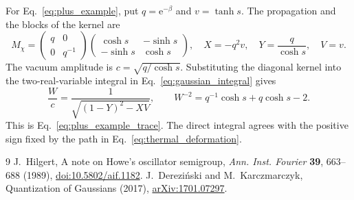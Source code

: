 \documentclass[11pt,a4paper]{article}
\newcommand{\ee}{\mathrm e}
\numberwithin{equation}{section}
\begin{document}
For Eq.~\eqref{eq:plus_example}, put $q=\ee^{-\beta}$ and $v=\tanh s$.
The propagation and the blocks of the kernel are
\begin{equation}
 M_\chi=
 \begin{pmatrix}q&0\\0&q^{-1}\end{pmatrix}
 \begin{pmatrix}\cosh s&-\sinh s\\-\sinh s&\cosh s\end{pmatrix},
 \quad X=-q^2v,\quad Y=\frac{q}{\cosh s},\quad V=v.
\end{equation}
The vacuum amplitude is $c=\sqrt{q/\cosh s}$. Substituting the diagonal
kernel into the two-real-variable integral in
Eq.~\eqref{eq:gaussian_integral} gives
\begin{equation}
 \frac{W}{c}=\frac{1}{\sqrt{(1-Y)^2-XV}},
 \qquad
 W^{-2}=q^{-1}\cosh s+q\cosh s-2.
\end{equation}
This is Eq.~\eqref{eq:plus_example_trace}. The direct integral agrees
with the positive sign fixed by the path in
Eq.~\eqref{eq:thermal_deformation}.

\begin{thebibliography}{9}
J.~Hilgert, A note on Howe's oscillator semigroup,
\emph{Ann. Inst. Fourier} \textbf{39}, 663--688 (1989),
\href{https://doi.org/10.5802/aif.1182}{doi:10.5802/aif.1182}.
J.~Derezi\'nski and M.~Karczmarczyk, Quantization of Gaussians (2017),
\href{https://arxiv.org/abs/1701.07297}{arXiv:1701.07297}.
\end{thebibliography}
\end{document}
